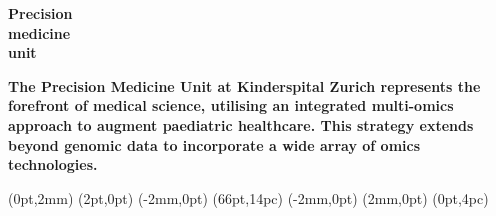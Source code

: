 


  \NewCoffin \result
  \NewCoffin \aaa
  \NewCoffin \bbb
  \NewCoffin \ccc
  \NewCoffin \ddd
  \NewCoffin \eee
  \NewCoffin \fff
  \NewCoffin {}
  \NewCoffin {}
  \NewCoffin {}

\SetHorizontalCoffin \result {}
\SetHorizontalCoffin {}


\SetHorizontalCoffin {}


\SetHorizontalCoffin {}
                     
                     

\SetVerticalCoffin \ddd {180pt}
                 {\raggedleft\fontsize{28}{20}\sffamily\bfseries 
                 Precision \\
                 medicine \\
                 unit \\
                 \vspace{-6em}
                  }
                                      

                      
      \SetHorizontalCoffin {}
				                
\SetVerticalCoffin \fff {140pt}
                 {\raggedright \fontsize{13}{14}\sffamily\bfseries 
                        The Precision Medicine Unit at Kinderspital Zurich represents the forefront of medical science, utilising an integrated multi-omics approach to augment paediatric healthcare. This strategy extends beyond genomic data to incorporate a wide array of omics technologies. }

\RotateCoffin {}
\RotateCoffin {}

\SetHorizontalCoffin {}

\SetHorizontalCoffin {}

\SetHorizontalCoffin {}


\JoinCoffins \result                \aaa 
\JoinCoffins {} (0pt,2mm)
\JoinCoffins {} \bbb     [B,r](2pt,0pt)
\JoinCoffins {} (-2mm,0pt)
\JoinCoffins {} \ccc     [B,l](66pt,14pc)
\JoinCoffins {} \fff     [t,r](-2mm,0pt)
\JoinCoffins {} (2mm,0pt)
\JoinCoffins {} \eee     [B,r]
\JoinCoffins {} \ddd     [B,r](0pt,4pc)
\TypesetCoffin \result
